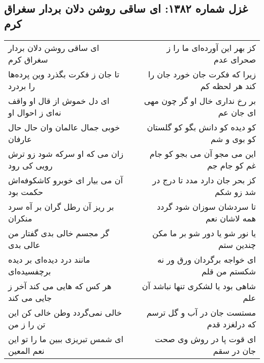 \begin{center}
\section*{غزل شماره ۱۳۸۲: ای ساقی روشن دلان بردار سغراق کرم}
\label{sec:1382}
\begin{longtable}{l p{0.5cm} r}
ای ساقی روشن دلان بردار سغراق کرم
&&
کز بهر این آورده‌ای ما را ز صحرای عدم
\\
تا جان ز فکرت بگذرد وین پرده‌ها را بردرد
&&
زیرا که فکرت جان خورد جان را کند هر لحظه کم
\\
ای دل خموش از قال او واقف نه‌ای ز احوال او
&&
بر رخ نداری خال او گر چون مهی ای جان عم
\\
خوبی جمال عالمان وان حال حال عارفان
&&
کو دیده کو دانش بگو کو گلستان کو بوی و شم
\\
زان می که او سرکه شود زو ترش رویی کی رود
&&
این می مجو آن می بجو کو جام غم کو جام جم
\\
آن می بیار ای خوبرو کاشکوفه‌اش حکمت بود
&&
کز بحر جان دارد مدد تا درج در شد زو شکم
\\
بر ریز آن رطل گران بر آه سرد منکران
&&
تا سردشان سوزان شود گردد همه لاشان نعم
\\
گر مجسم خالی بدی گفتار من عالی بدی
&&
یا نور شو یا دور شو بر ما مکن چندین ستم
\\
مانند درد دیده‌ای بر دیده برچفسیده‌ای
&&
ای خواجه برگردان ورق ور نه شکستم من قلم
\\
هر کس که هایی می کند آخر ز جایی می کند
&&
شاهی بود یا لشکری تنها نباشد آن علم
\\
خالی نمی‌گردد وطن خالی کن این تن را ز من
&&
مستست جان در آب و گل ترسم که درلغزد قدم
\\
ای شمس تبریزی ببین ما را تو این نعم المعین
&&
ای قوت پا در روش وی صحت جان در سقم
\\
\end{longtable}
\end{center}
